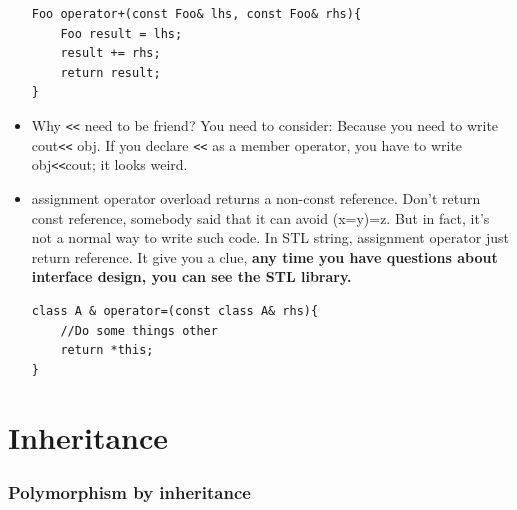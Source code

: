 \documentclass[a4paper,11pt,twoside]{book}
\begin{document}
\begin{itemize}
\begin{lstlisting}[numbers=none]
Foo operator+(const Foo& lhs, const Foo& rhs){
	Foo result = lhs;
	result += rhs;
	return result;
}
\end{lstlisting}
	
	\item Why \verb=<<= need to be friend? You need to consider:  Because you need to write cout\verb=<<= obj. If you declare \verb=<<= as a member operator, you have to write obj\verb=<<=cout; it looks weird.
	
	
	
	\item assignment operator overload returns a non-const reference. Don't return const reference, somebody said that it can avoid (x=y)=z. But in fact, it's not a normal way to write such code. In STL string, assignment operator just return reference. It give you a clue, \textbf{any time you have questions about interface design, you can see the STL library.}
\begin{lstlisting}[numbers=none]
class A & operator=(const class A& rhs){	
	//Do some things other
	return *this;
}
\end{lstlisting}
	
\end{itemize}


\section{Inheritance}
\subsubsection{Polymorphism by inheritance}
\end{document}
